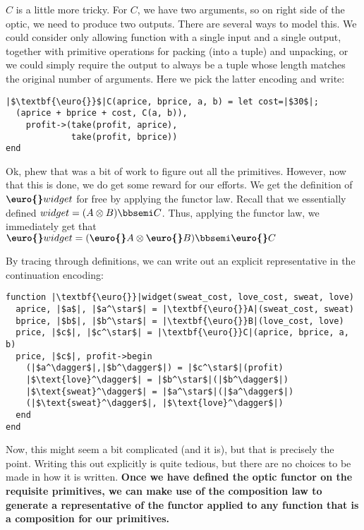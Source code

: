 \documentclass[letterpaper, 10 pt, conference]{ieeeconf}  %
\begin{document}
$C$ is a little more tricky. For $C$, we have two arguments, so on right side
of the optic, we need to produce two outputs. There are several ways to model
this. We could consider only allowing function with a single input and a single
output, together with primitive operations for packing (into a tuple) and
unpacking, or we could simply require the output to always be a tuple whose
length matches the original number of arguments. Here we pick the latter
encoding and write:

\begin{verbatim}
|$\textbf{\euro{}}$|C(aprice, bprice, a, b) = let cost=|$30$|;
  (aprice + bprice + cost, C(a, b)),
    profit->(take(profit, aprice),
             take(profit, bprice))
end
\end{verbatim}

Ok, phew that was a bit of work to figure out all the primitives. However, now
that this is done, we do get some reward for our efforts. We get the definition
of $\textbf{\euro{}}widget$ for free by applying the functor law. Recall that
we essentially defined $widget = (A \otimes B) \bbsemi C$. Thus, applying the
functor law, we immediately get that $\textbf{\euro{}}widget = (\textbf{\euro{}}A \otimes \textbf{\euro{}}B) \bbsemi \textbf{\euro{}}C$

By tracing through definitions, we can write out an explicit representative in
the continuation encoding:

\begin{verbatim}
function |\textbf{\euro{}}|widget(sweat_cost, love_cost, sweat, love)
  aprice, |$a$|, |$a^\star$| = |\textbf{\euro{}}A|(sweat_cost, sweat)
  bprice, |$b$|, |$b^\star$| = |\textbf{\euro{}}B|(love_cost, love)
  price, |$c$|, |$c^\star$| = |\textbf{\euro{}}C|(aprice, bprice, a, b)
  price, |$c$|, profit->begin
    (|$a^\dagger$|,|$b^\dagger$|) = |$c^\star$|(profit)
    |$\text{love}^\dagger$| = |$b^\star$|(|$b^\dagger$|)
    |$\text{sweat}^\dagger$| = |$a^\star$|(|$a^\dagger$|)
    (|$\text{sweat}^\dagger$|, |$\text{love}^\dagger$|)
  end
end
\end{verbatim}

Now, this might seem a bit complicated (and it is), but that is precisely the
point. Writing this out explicitly is quite tedious, but there are no choices
to be made in how it is written. \textbf{Once we have defined the optic functor on the
requisite primitives, we can make use of the composition law to generate a
representative of the functor applied to any function that is a composition
for our primitives.}
\end{document}
